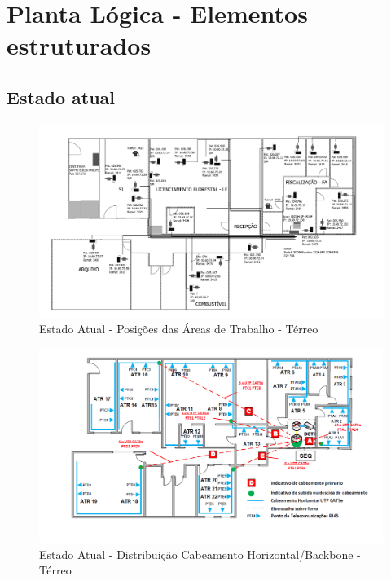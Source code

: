 \documentclass[	DIV=calc,%
							paper=a4,%
							fontsize=12pt,%
							onecolumn]{scrartcl}	 					%
\begin{document}
\section{Planta Lógica - Elementos estruturados}

\subsection{Estado atual}
\begin{figure}[h!]
	\centering
	\includegraphics[width=\textwidth]{figura3.png}
	\caption[Estado Atual - Posições das Áreas de Trabalho - Térreo]{Estado Atual - Posições das Áreas de Trabalho - Térreo}
	\label{fig:figura3}
\end{figure}

\begin{figure}[h!]
	\centering
	\includegraphics[width=\textwidth]{figura4.png}
	\caption[Estado Atual - Distribuição Cabeamento Horizontal/Backbone - Térreo]{Estado Atual - Distribuição Cabeamento Horizontal/Backbone - Térreo}
	\label{fig:figura4}
\end{figure}
\end{document}
